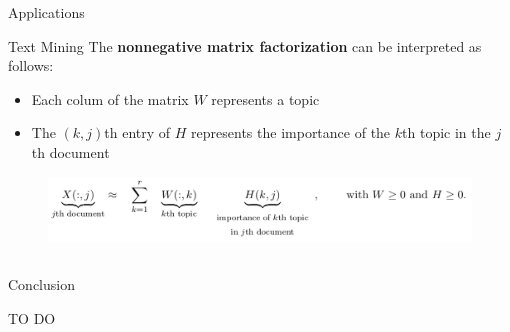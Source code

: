 \documentclass[final]{beamer}
\newlength{\twocolwid}
\newlength{\threecolwid}
\begin{document}
\begin{frame}
\begin{columns}[t]
\begin{column}{\threecolwid}
\begin{columns}[t]
\begin{column}{\twocolwid}
\begin{exampleblock}{Applications}
\begin{block}{Text Mining}
The \textbf{nonnegative matrix factorization} can be interpreted as follows:\\
\begin{itemize}
    \item Each colum of the matrix $W$ represents a topic
    \item The $(k,j)$th entry of $H$ represents the importance of the $k$th topic in the $j$th document
\end{itemize}
\begin{figure}
    \centering
    \includegraphics{presentation/Poster/NMF_app2.png}
\end{figure}
\end{block}

\end{exampleblock}

\end{column} %

\end{columns}

\begin{alertblock}{Conclusion}

TO DO

\end{alertblock}



\end{column}
\end{columns}
\end{frame}
\end{document}
